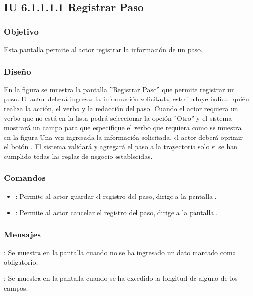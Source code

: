 \subsection{IU 6.1.1.1.1 Registrar Paso}

\subsubsection{Objetivo}
	Esta pantalla permite al actor registrar la información de un paso.
\subsubsection{Diseño}
	En la figura  se muestra la pantalla ''Registrar Paso'' que permite registrar un paso. El actor deberá ingresar la información solicitada, esto incluye indicar quién realiza la acción, el verbo y la redacción del paso.
	Cuando el actor requiera un verbo que no está en la lista podrá seleccionar la opción ''Otro'' y el sistema mostrará un campo para que especifique el verbo que requiera como se muestra en la figura 
	Una vez ingresada la información solicitada, el actor deberá oprimir el botón  . El sistema validará y agregará el paso a la trayectoria solo si se han cumplido todas las reglas de negocio establecidas.

\subsubsection{Comandos}
\begin{itemize}
	\item {}: Permite al actor guardar el registro del paso, dirige a la pantalla .
	\item {}: Permite al actor cancelar el registro del paso, dirige a la pantalla .
\end{itemize}

\subsubsection{Mensajes}

\begin{Citemize}
	\item {}: Se muestra en la pantalla  cuando no se ha ingresado un dato marcado como obligatorio.
	\item {}: Se muestra en la pantalla  cuando se ha excedido la longitud de alguno de los campos.
\end{Citemize}
